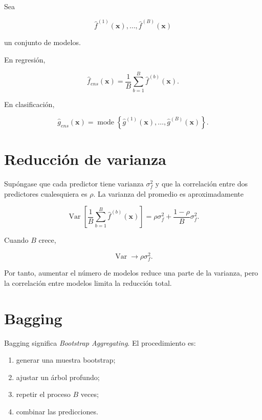 \documentclass[
  spanish,
  10.5pt,
  letterpaper,
  DIV=11,
  numbers=noendperiod,
  oneside,
  open=any]{scrreprt}
\providecommand{\tightlist}{%
  \setlength{\itemsep}{0pt}\setlength{\parskip}{0pt}}
\theoremstyle{definition}
\theoremstyle{definition}
\theoremstyle{plain}
\theoremstyle{remark}
\begin{document}
Sea

\[
\widehat{f}^{(1)}(\mathbf{x}),\ldots,\widehat{f}^{(B)}(\mathbf{x})
\]

un conjunto de modelos.

En regresión,

\[
\widehat{f}_{ens}(\mathbf{x})
=
\frac{1}{B}\sum_{b=1}^{B}\widehat{f}^{(b)}(\mathbf{x}).
\]

En clasificación,

\[
\widehat{g}_{ens}(\mathbf{x})
=
\operatorname{mode}
\left\{
\widehat{g}^{(1)}(\mathbf{x}),\ldots,\widehat{g}^{(B)}(\mathbf{x})
\right\}.
\]

\section*{Reducción de varianza}\label{reducciuxf3n-de-varianza}


Supóngase que cada predictor tiene varianza \(\sigma_f^2\) y que la
correlación entre dos predictores cualesquiera es \(\rho\). La varianza
del promedio es aproximadamente

\[
\operatorname{Var}
\left[
\frac{1}{B}\sum_{b=1}^{B}\widehat{f}^{(b)}(\mathbf{x})
\right]
=
\rho\sigma_f^2
+
\frac{1-\rho}{B}\sigma_f^2.
\]

Cuando \(B\) crece,

\[
\operatorname{Var}\to\rho\sigma_f^2.
\]

Por tanto, aumentar el número de modelos reduce una parte de la
varianza, pero la correlación entre modelos limita la reducción total.

\section*{Bagging}\label{bagging}


Bagging significa \emph{Bootstrap Aggregating}. El procedimiento es:

\begin{enumerate}
\def\labelenumi{\arabic{enumi}.}
\tightlist
\item
  generar una muestra bootstrap;
\item
  ajustar un árbol profundo;
\item
  repetir el proceso \(B\) veces;
\item
  combinar las predicciones.
\end{enumerate}
\end{document}
